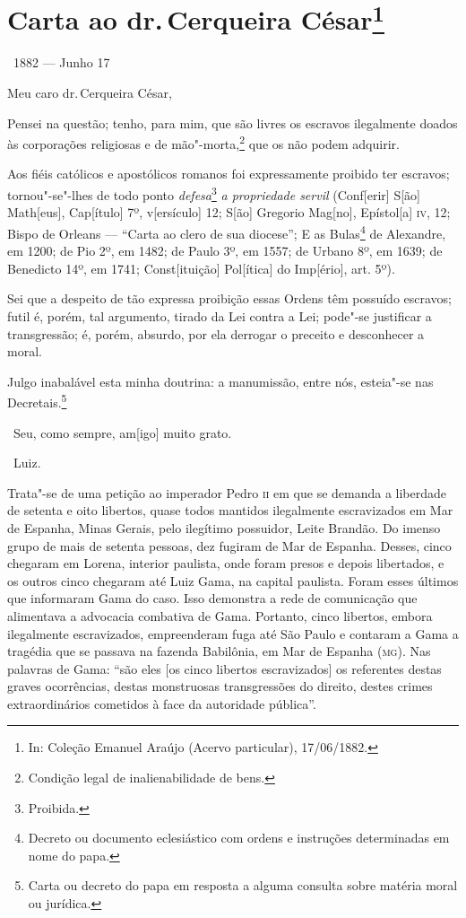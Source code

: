 \chapter{Carta ao dr.\,Cerqueira César\footnote[*]{In: Coleção Emanuel
  Araújo (Acervo particular), 17/06/1882.}}


\hfill\ 1882 --- Junho 17\bigskip

\noindent{}Meu caro dr.\,Cerqueira César,

Pensei na questão; tenho, para mim, que são livres os escravos
ilegalmente doados às corporações religiosas e de mão"-morta,\footnote{
  Condição legal de inalienabilidade de bens.} que os não podem
adquirir.

Aos fiéis católicos e apostólicos romanos foi expressamente proibido ter
escravos; tornou"-se"-lhes de todo ponto \emph{defesa}\footnote{
  Proibida.} \emph{a propriedade servil} (Conf{[}erir{]} S{[}ão{]}
Math{[}eus{]}, Cap{[}ítulo{]} 7º, v{[}ersículo{]} 12; S{[}ão{]} Gregorio
Mag{[}no{]}, Epístol{[}a{]} \textsc{iv}, 12; Bispo de Orleans --- ``Carta ao
clero de sua diocese''; E as Bulas\footnote{Decreto ou documento
  eclesiástico com ordens e instruções determinadas em nome do papa.}
de Alexandre, em 1200; de Pio 2º, em 1482; de Paulo
3º, em 1557; de Urbano 8º, em 1639; de Benedicto 14º, em 1741;
Const{[}ituição{]} Pol{[}ítica{]} do Imp{[}ério{]}, art. 5º).

Sei que a despeito de tão expressa proibição essas Ordens têm possuído
escravos; futil é, porém, tal argumento, tirado da Lei contra a Lei;
pode"-se justificar a transgressão; é, porém, absurdo, por ela derrogar o
preceito e desconhecer a moral.

Julgo inabalável esta minha doutrina: a manumissão, entre nós, esteia"-se
nas Decretais.\footnote{Carta ou decreto do papa em resposta a alguma
  consulta sobre matéria moral ou jurídica.}

\hfill\ Seu, como sempre, am{[}igo{]} muito grato.

\hfill\ Luiz.

\pagebreak
\mbox{}\vfill
\thispagestyle{empty}

{\small\noindent
Trata"-se de uma petição ao imperador Pedro \textsc{ii} em que se demanda a
liberdade de setenta e oito libertos, quase todos mantidos
ilegalmente escravizados em Mar de Espanha, Minas Gerais, pelo ilegítimo
possuidor, Leite Brandão. Do imenso grupo de mais de setenta pessoas,
dez fugiram de Mar de Espanha. Desses, cinco chegaram em Lorena,
interior paulista, onde foram presos e depois libertados, e os
outros cinco chegaram até Luiz Gama, na capital paulista. Foram esses
últimos que informaram Gama do caso. Isso demonstra a rede de comunicação que alimentava a
advocacia combativa de Gama. Portanto, cinco libertos, embora
ilegalmente escravizados, empreenderam fuga até São Paulo e contaram a
Gama a tragédia que se passava na fazenda Babilônia, em Mar de Espanha
(\textsc{mg}). Nas palavras de Gama: ``são eles {[}os cinco libertos
escravizados{]} os referentes destas graves ocorrências, destas
monstruosas transgressões do direito, destes crimes extraordinários
cometidos à face da autoridade pública''. }

